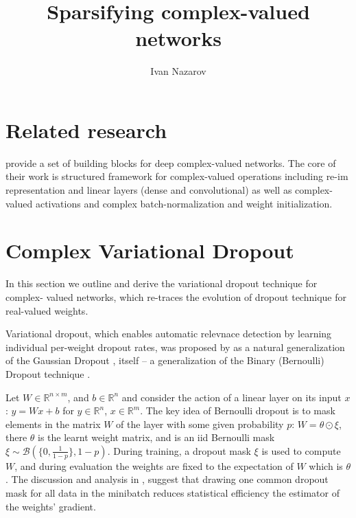 \documentclass[a4paper,10pt]{article}
\title{Sparsifying complex-valued networks}
\author{Ivan Nazarov}
\newcommand{\real}{\mathbb{R}}
\begin{document}
\maketitle


\section{Related research} %
\label{sec:realted_research}

\cite{trabelsi_deep_2017} provide a set of building blocks for deep complex-valued
networks. The core of their work is structured framework for complex-valued operations
including re-im representation and linear layers (dense and convolutional) as well
as complex-valued activations and complex batch-normalization and weight initialization.


\section{Complex Variational Dropout} %
\label{sec:complex_varaitional_dropout}

In this section we outline and derive the variational dropout technique for complex-%
valued networks, which re-traces the evolution of dropout technique for real-valued
weights.

Variational dropout, which enables automatic relevnace detection by learning individual
per-weight dropout rates, was proposed by \cite{kingma_variational_2015} as a natural
generalization of the Gaussian Dropout \cite{srivastava_dropout_2014,wang_fast_2013},
itself -- a generalization of the Binary (Bernoulli) Dropout technique \cite{hinton_improving_2012}.

Let $W \in\real^{n\times m}$, and $b\in \real^n$ and consider the action of a linear
layer on its input $x$: $y = W x + b$ for $y\in \real^n$, $x\in \real^m$. The key idea
of Bernoulli dropout is to mask elements in the matrix $W$ of the layer with some given
probability $p$: $W = \theta \odot \xi$, there $\theta$ is the learnt weight matrix,
and is an iid Bernoulli mask $\xi \sim \mathcal{B}(\{0, \tfrac1{1-p}\}, 1-p)$. During
training, a dropout mask $\xi$ is used to compute $W$, and during evaluation the weights
are fixed to the expectation of $W$ which is $\theta$. The discussion and analysis in
\cite{kingma_variational_2015}, suggest that drawing one common dropout mask for all
data in the minibatch reduces statistical efficiency the estimator of the weights'
gradient.
\end{document}
